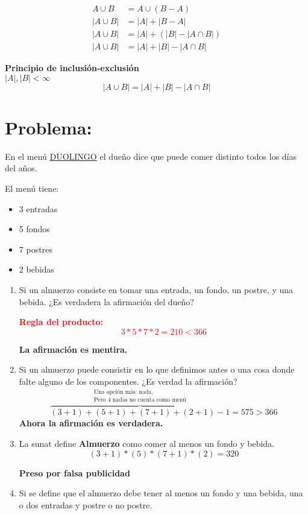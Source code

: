 \documentclass[../main.tex]{subfiles}
\begin{document}
\begin{align*}
	A\cup B &= A \cup(B-A)\\
	|A\cup B| &= |A| + |B-A|\\
	|A\cup B| &= |A| + (|B|-|A\cap B|)\\
	|A\cup B| &= |A| + |B| - |A\cap B|
\end{align*}

\textbf{Principio de inclusión-exclusión}\\
$|A|,|B|<\infty$
\[
	|A\cup B| = |A|+|B|-|A\cap B|
\]

\section{Problema:}%

En el menú \underline{DUOLINGO} el dueño dice que puede comer distinto todos los días
del años.

El menú tiene:
\begin{itemize}
	\item 3 entradas
	\item 5 fondos
	\item 7 postres
	\item 2 bebidas
\end{itemize}
\begin{enumerate}
	\item Si un almuerzo consiste en tomar una entrada, un fondo, un postre,
y una bebida.
¿Es verdadera la afirmación del dueño?

\textbf{\textcolor{red}{Regla del producto:\[3*5*7*2=210 < 366\]}}

\textbf{La afirmación es mentira.}

\item Si un almuerzo puede consistir en lo que definimos antes
o una cosa donde falte alguno de los componentes.
¿Es verdad la afirmación?
\[
	\overbrace{(3+1)+(5+1)+(7+1)+(2+1)-1}^
	{\substack{\text{Una opción más: nada.}\\
			\text{Pero $4$ nadas no cuenta como menú}
	}}=575>366
\]
\textbf{Ahora la afirmación es verdadera.}

\item La sunat define \textbf{Almuerzo} como comer
al menos un fondo y bebida.
\[
	(3+1)*(5)*(7+1)*(2) = 320
\]

\textbf{Preso por falsa publicidad}

\item Si se define que el almuerzo debe tener al menos un fondo
y una bebida, una o dos entradas y postre o no postre.

\end{enumerate}
\end{document}

